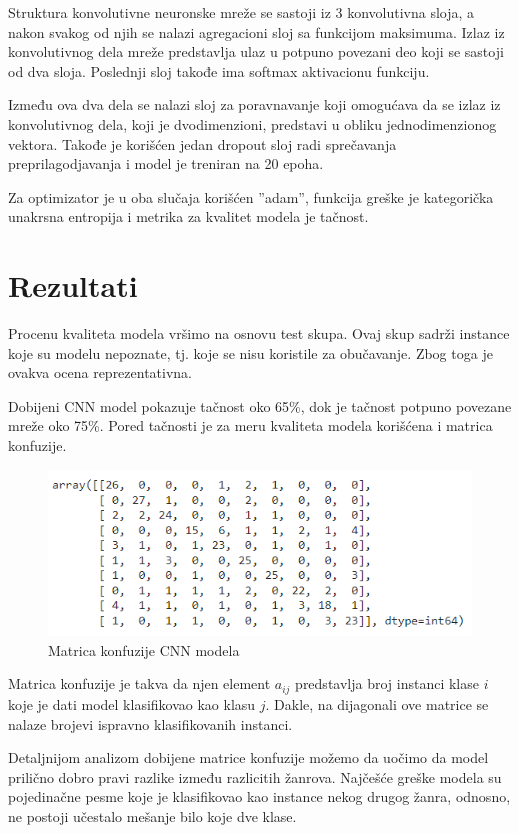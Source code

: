 \documentclass{article}
\begin{document}
Struktura konvolutivne neuronske mreže se sastoji iz 3 konvolutivna sloja, a nakon svakog od njih se nalazi agregacioni sloj sa funkcijom maksimuma. Izlaz iz konvolutivnog dela mreže predstavlja ulaz u potpuno povezani deo koji se sastoji od dva sloja. Poslednji sloj takođe ima softmax aktivacionu funkciju.

Između ova dva dela se nalazi sloj za poravnavanje koji omogućava da se izlaz iz konvolutivnog dela, koji je dvodimenzioni, predstavi u obliku jednodimenzionog vektora. Takođe je korišćen jedan dropout sloj radi sprečavanja preprilagodjavanja i model je treniran na 20 epoha.

Za optimizator je u oba slučaja korišćen ''adam'', funkcija greške je kategorička unakrsna entropija i metrika za kvalitet modela je tačnost. 

\newpage

\section{Rezultati}

Procenu kvaliteta modela vršimo na osnovu test skupa. Ovaj skup sadrži instance koje su modelu nepoznate, tj. koje se nisu koristile za obučavanje. Zbog toga je ovakva ocena reprezentativna.

Dobijeni CNN model pokazuje tačnost oko 65\%, dok je tačnost potpuno povezane mreže oko 75\%. Pored tačnosti je za meru kvaliteta modela korišćena i matrica konfuzije.

\begin{figure}[h]
\centering
\includegraphics[scale=1.2]{matrix}
\caption{Matrica konfuzije CNN modela}
\end{figure}

Matrica konfuzije je takva da njen element $a_{ij}$ predstavlja broj instanci klase $i$ koje je dati model klasifikovao kao klasu $j$. Dakle, na dijagonali ove matrice se nalaze brojevi ispravno klasifikovanih instanci.

Detaljnijom analizom dobijene matrice konfuzije možemo da uočimo da model prilično dobro pravi razlike između razlicitih žanrova. Najčešće greške modela su pojedinačne pesme koje je klasifikovao kao instance nekog drugog žanra, odnosno, ne postoji učestalo mešanje bilo koje dve klase.
\end{document}
